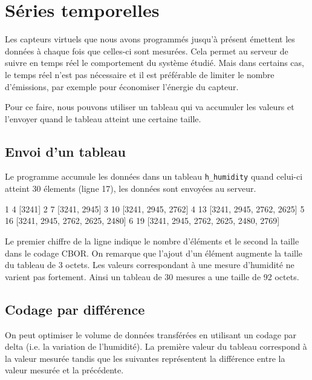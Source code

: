 \chapter{Séries temporelles}

\begin{figure}
\end{figure}

Les capteurs virtuels que nous avons programmés jusqu’à présent émettent les données à chaque fois que celles-ci sont mesurées. Cela permet au serveur de suivre en temps réel le comportement du système étudié. Mais dans certains cas, le temps réel n’est pas nécessaire et il est préférable de limiter le nombre d’émissions, par exemple pour économiser l'énergie du capteur.

Pour ce faire, nous pouvons utiliser un tableau qui va accumuler les valeurs et l’envoyer quand le tableau atteint une certaine taille.


\section{Envoi d'un tableau}

Le programme  accumule les données dans un tableau \texttt{h\_humidity} quand celui-ci atteint 30 élements (ligne 17), les données sont envoyées au serveur.




\begin{termc}[backgroundcolor=\color{palerod}, language=json, basicstyle=\ttfamily\small, escapechar=#]
1 4 [3241]
2 7 [3241, 2945]
3 10 [3241, 2945, 2762]
4 13 [3241, 2945, 2762, 2625]
5 16 [3241, 2945, 2762, 2625, 2480]
6 19 [3241, 2945, 2762, 2625, 2480, 2769]
\end{termc}

Le premier chiffre de la ligne indique le nombre d'éléments et le second la taille dans le codage CBOR. On remarque que l'ajout d'un élément augmente la taille du tableau de 3 octets. Les valeurs correspondant à une mesure d'humidité ne varient pas fortement. Ainsi un tableau de 30 mesures a une taille de 92 octets.

\section{Codage par différence}

On peut optimiser le volume de données transférées en utilisant un codage par delta (i.e. la variation de l'humidité). La première valeur du tableau correspond à la valeur mesurée tandis que les suivantes représentent la différence entre la valeur mesurée et la précédente.

